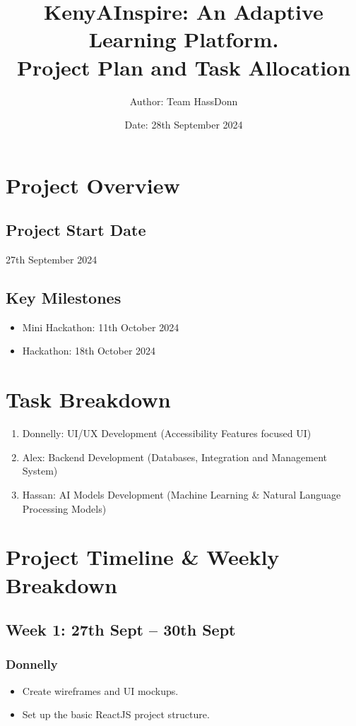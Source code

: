 \documentclass{article}
\title{KenyAInspire: An Adaptive Learning Platform. \\ Project Plan and Task Allocation}
\author{Author: Team HassDonn}
\date{Date: 28th September 2024}
\begin{document}
\maketitle

\section{Project Overview}
\subsection{Project Start Date}
27th September 2024

\subsection{Key Milestones}
\begin{itemize}
    \item Mini Hackathon: 11th October 2024
    \item Hackathon: 18th October 2024
\end{itemize}

\section{Task Breakdown}
\begin{enumerate}
    \item Donnelly: UI/UX Development (Accessibility Features focused UI)
    \item Alex: Backend Development (Databases, Integration and Management System)
    \item Hassan: AI Models Development (Machine Learning \& Natural Language Processing Models)
\end{enumerate}

\section{Project Timeline \& Weekly Breakdown}

\subsection{Week 1: 27th Sept – 30th Sept}
\subsubsection{Donnelly}
\begin{itemize}
    \item Create wireframes and UI mockups.
    \item Set up the basic ReactJS project structure.
\end{itemize}
\end{document}
